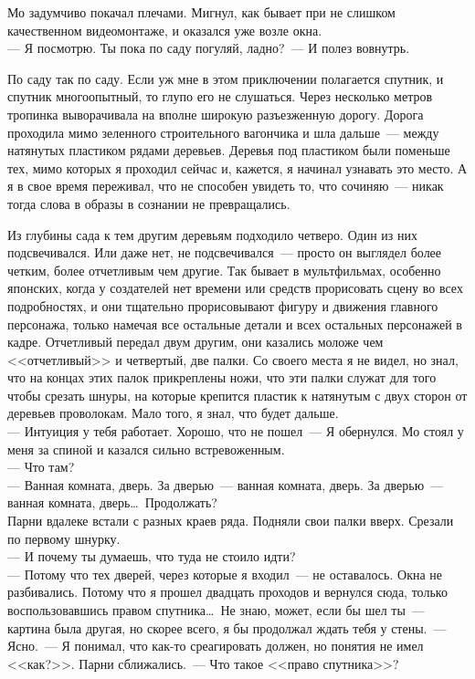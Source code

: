 Мо задумчиво покачал плечами. Мигнул, как бывает при не слишком качественном 
видеомонтаже, и оказался уже возле окна.\\
--- Я посмотрю. Ты пока по саду погуляй, ладно?~--- И полез вовнутрь.

По саду так по саду. Если уж мне в этом приключении полагается спутник, и 
спутник многоопытный, то глупо его не слушаться. Через несколько метров 
тропинка выворачивала на вполне широкую разъезженную дорогу. Дорога проходила мимо 
зеленного строительного вагончика и шла дальше~--- между натянутых пластиком 
рядами деревьев. Деревья под пластиком были поменьше тех, мимо которых я 
проходил сейчас и, кажется, я начинал узнавать это место. А я в свое время 
переживал, что не способен увидеть то, что сочиняю~--- никак тогда слова в 
образы в сознании не превращались.

Из глубины сада к тем другим деревьям подходило четверо. Один из них 
подсвечивался. Или даже нет, не подсвечивался~--- просто он выглядел более 
четким, более отчетливым чем другие. Так бывает в мультфильмах, особенно японских, 
когда у создателей нет времени или средств прорисовать сцену во всех подробностях, и 
они тщательно прорисовывают фигуру и движения главного персонажа, только 
намечая все остальные детали и всех остальных персонажей в кадре. Отчетливый передал 
двум другим, они казались моложе чем <<отчетливый>> и четвертый, две палки. Со 
своего места я не видел, но знал, что на концах этих палок прикреплены ножи, 
что эти палки служат для того чтобы срезать шнуры, на которые крепится пластик к 
натянутым с двух сторон от деревьев проволокам. Мало того, я знал, что будет 
дальше.\\
--- Интуиция у тебя работает. Хорошо, что не пошел~--- Я обернулся. Мо стоял у 
меня за спиной и казался сильно встревоженным.\\
--- Что там?\\
--- Ванная комната, дверь. За дверью~--- ванная комната, дверь. За дверью~--- 
ванная комната, дверь\ldots\ Продолжать?\\
Парни вдалеке встали с разных краев ряда. Подняли свои палки вверх. Срезали по 
первому шнурку.\\
--- И почему ты думаешь, что туда не стоило идти?\\
--- Потому что тех дверей, через которые я входил~--- не оставалось. Окна не 
разбивались. Потому что я прошел двадцать проходов и вернулся сюда, только 
воспользовавшись правом спутника\ldots\ Не знаю, может, если бы шел ты~--- 
картина была другая, но скорее всего, я бы продолжал ждать тебя у стены.~--- Ясно.~--- 
Я понимал, что как-то среагировать должен, но понятия не имел <<как?>>. Парни 
сближались.~--- Что такое <<право спутника>>?

